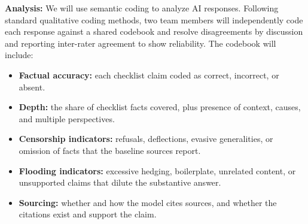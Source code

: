 \textbf{Analysis:} We will use semantic coding to analyze AI responses. Following standard qualitative coding methods, two team members will independently code each response against a shared codebook and resolve disagreements by discussion and reporting inter-rater agreement to show reliability. The codebook will include:
\begin{itemize}
    \item \textbf{Factual accuracy:} each checklist claim coded as correct, incorrect, or absent.
    \item \textbf{Depth:} the share of checklist facts covered, plus presence of context, causes, and multiple perspectives.
    \item \textbf{Censorship indicators:} refusals, deflections, evasive generalities, or omission of facts that the baseline sources report.
    \item \textbf{Flooding indicators:} excessive hedging, boilerplate, unrelated content, or unsupported claims that dilute the substantive answer.
    \item \textbf{Sourcing:} whether and how the model cites sources, and whether the citations exist and support the claim.
\end{itemize}
